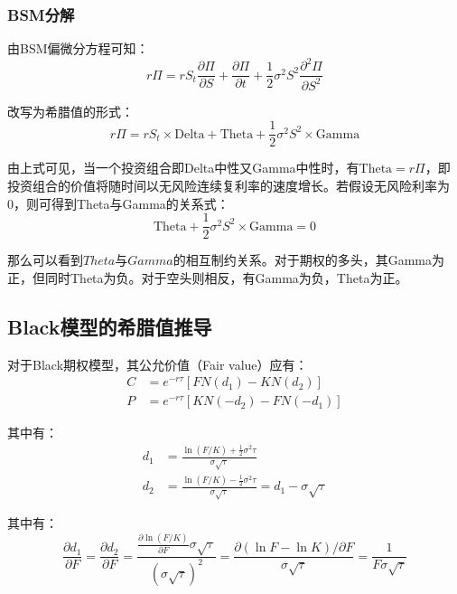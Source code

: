 \documentclass[11pt]{article}
\begin{document}
\subsubsection{BSM分解}

由BSM偏微分方程可知：
\begin{equation*}
    r \Pi = r S_t \frac{\partial \Pi}{\partial S} + \frac{\partial \Pi}{\partial t} + \frac{1}{2} \sigma^2 S^2 \frac{\partial^2 \Pi}{\partial S^2}
\end{equation*}

改写为希腊值的形式：
\begin{equation*}
    \boxed{
        r \Pi = r S_t \times \text{Delta} + \text{Theta} + \frac{1}{2} \sigma^2 S^2 \times \text{Gamma}
    }
\end{equation*}

由上式可见，当一个投资组合即Delta中性又Gamma中性时，有$\text{Theta} = r\Pi$，即投资组合的价值将随时间以无风险连续复利率的速度增长。若假设无风险利率为0，则可得到Theta与Gamma的关系式：
\begin{equation*}
    \text{Theta} + \frac{1}{2} \sigma^2 S^2 \times \text{Gamma} = 0
\end{equation*}

那么可以看到$Theta$与$Gamma$的相互制约关系。对于期权的多头，其Gamma为正，但同时Theta为负。对于空头则相反，有Gamma为负，Theta为正。

\subsection{Black模型的希腊值推导}

对于Black期权模型，其公允价值（Fair value）应有：
\begin{align*}
    C &= e^{-r\tau}\left[FN(d_1) - KN(d_2)\right] \\
    P &= e^{-r\tau}\left[KN(-d_2) - FN(-d_1)\right]
\end{align*}

其中有：
\begin{align*}
    d_1 &= \frac{\ln(F/K) + \frac{1}{2} \sigma^2 \tau}{\sigma \sqrt{\tau}} \\
    d_2 &= \frac{\ln(F/K) - \frac{1}{2} \sigma^2 \tau}{\sigma \sqrt{\tau}}
    = d_1 - \sigma \sqrt{\tau}
\end{align*}

其中有：
\begin{equation*}
    \frac{\partial d_1}{\partial F} = \frac{\partial d_2}{\partial F} = \frac{\frac{\partial \ln(F/K)}{\partial F} \sigma \sqrt{\tau}}{(\sigma \sqrt{\tau})^2} = \frac{\partial (\ln F - \ln K)/\partial F}{\sigma\sqrt{\tau}} = \frac{1}{F\sigma\sqrt{\tau}}
\end{equation*}
\end{document}
